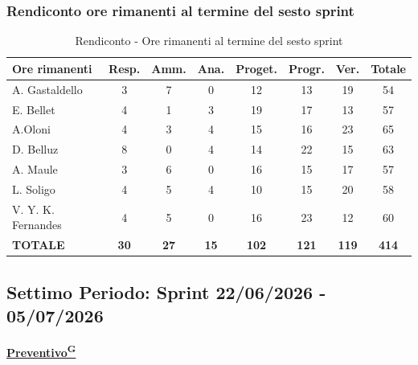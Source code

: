 \documentclass[a4paper,12pt]{article}
\providecommand{\glslink}[2]{\href{https://alittlebyte-19.github.io/Documentazione/glossario.html\#gls-#1}{\underline{#2}\textsuperscript{\scriptsize G}}}
\begin{document}
\subsubsection{Rendiconto ore rimanenti al termine del sesto sprint}
\begin{table}[htbp]
\centering
\renewcommand{\arraystretch}{1.5} 
\begin{tabularx}{\textwidth}{|X|c|c|c|c|c|c|c|}
\hline
\textbf{Ore rimanenti} & \textbf{Resp.} & \textbf{Amm.} & \textbf{Ana.} & \textbf{Proget.} & \textbf{Progr.} & \textbf{Ver.} & \textbf{Totale} \\
\hline
A. Gastaldello & 3 & 7 & 0 & 12 & 13 & 19 & 54 \\
\hline
E. Bellet & 4 & 1 & 3 & 19 & 17 & 13 & 57 \\
\hline
A.Oloni & 4 & 3 & 4 & 15 & 16 & 23 & 65 \\
\hline
D. Belluz & 8 & 0 & 4 & 14 & 22 & 15 & 63 \\
\hline
A. Maule & 3 & 6 & 0 & 16 & 15 & 17 & 57 \\
\hline
L. Soligo & 4 & 5 & 4 & 10 & 15 & 20 & 58 \\
\hline
V. Y. K. Fernandes & 4 & 5 & 0 & 16 & 23 & 12 & 60 \\
\hline
\rowcolor{gray!20}
\textbf{TOTALE} & \textbf{30} & \textbf{27} & \textbf{15} & \textbf{102} & \textbf{121} & \textbf{119} & \textbf{414} \\
\hline
\end{tabularx}
\caption{Rendiconto - Ore rimanenti al termine del sesto sprint}
\end{table}

\newpage
\subsection {Settimo Periodo: Sprint 22/06/2026 - 05/07/2026}

\label{sec:pec_settimoperiodo}

\vspace{0.5em}

\begin{center}
\noindent\textbf{\glslink{preventivo}{Preventivo}}
\end{center}
\end{document}
